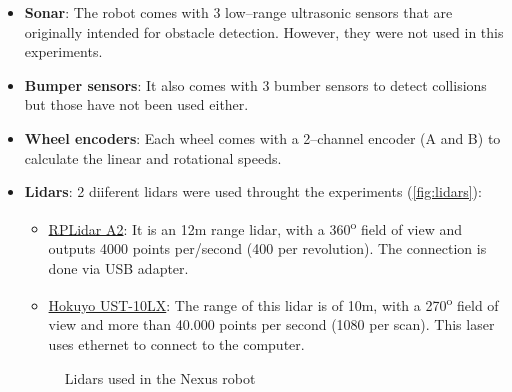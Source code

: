 \begin{itemize}
  \item \textbf{Sonar}: The robot comes with 3 low--range ultrasonic sensors that are originally intended for obstacle detection. However, they were not used in this experiments.

  \item \textbf{Bumper sensors}: It also comes with 3 bumber sensors to detect collisions but those have not been used either.

  \item \textbf{Wheel encoders}: Each wheel comes with a 2--channel encoder (A and B) to calculate the linear and rotational speeds.

  \item \textbf{Lidars}: 2 diiferent lidars were used throught the experiments (\autoref{fig:lidars}):
  \begin{itemize}
    \item \href{https://www.slamtec.com/en/Lidar/A2}{RPLidar A2}: It is an 12m range lidar, with a 360\textsuperscript{o} field of view and outputs 4000 points per/second (400 per revolution). The connection is done via USB adapter. 

    \item \href{https://www.hokuyo-usa.com/products/scanning-laser-rangefinders/ust-10lx}{Hokuyo UST-10LX}: The range of this lidar is of 10m, with a 270\textsuperscript{o} field of view and more than 40.000 points per second (1080 per scan). This laser uses ethernet to connect to the computer.
  \end{itemize}

  \begin{figure}[htb]
    \centering
     \quad
    \caption{Lidars used in the Nexus robot}
    \label{fig:lidars}
  \end{figure} 
\end{itemize}  

